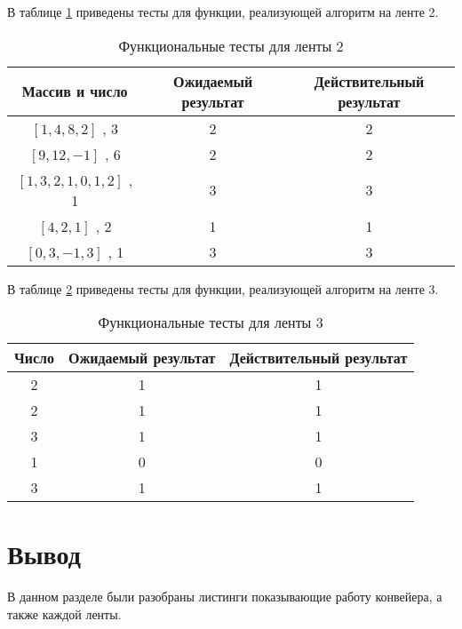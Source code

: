 В таблице \ref{tbl:ft3} приведены тесты для функции, реализующей алгоритм на ленте 2.

\begin{table}[h]
	\begin{center}
		\caption{\label{tbl:ft3} Функциональные тесты для ленты 2}
		\begin{tabular}{|c|c|c|}
			\hline
			Массив и число & Ожидаемый результат & Действительный результат \\ 
			\hline
			$[1,4,8,2]$ , 3        & 2 & 2\\
			$[9,12,-1]$ , 6        & 2 & 2\\
			$[1,3,2,1,0,1,2]$ , 1  & 3 & 3\\
			$[4,2,1]$ , 2          & 1 & 1\\
			$[0,3,-1,3]$ , 1       & 3 & 3\\
			\hline
		\end{tabular}
	\end{center}
\end{table}

В таблице \ref{tbl:ft4} приведены тесты для функции, реализующей алгоритм на ленте 3.

\begin{table}[h]
	\begin{center}
		\caption{\label{tbl:ft4} Функциональные тесты для ленты 3}
		\begin{tabular}{|c|c|c|}
			\hline
			Число & Ожидаемый результат & Действительный результат \\ 
			\hline
			2  & 1 & 1\\
			2  & 1 & 1\\
			3  & 1 & 1\\
			1  & 0 & 0\\
			3  & 1 & 1\\
			\hline
		\end{tabular}
	\end{center}
\end{table}


\section{Вывод}
В данном разделе были разобраны листинги  показывающие
работу конвейера, а также каждой ленты.
